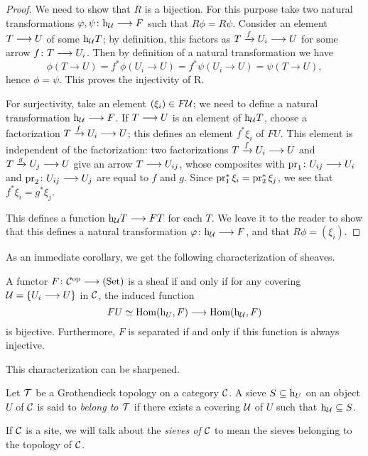 \begin{2   CONTRAVARIANT FUNCTORS}
\begin{2.3 Sheaves in Grothendieck topologies}
\begin{proof}
We need to show that $R$ is a bijection. For this purpose take two natural transformations $\phi, \psi \colon \h_{\cU} \arr F$ such that $R\phi = R\psi$. Consider an element $T \arr U$ of some $\mathrm{h}_{\mathcal{U}}T$; by definition, this factors as $T \xarr{f} U_{i} \arr U$ for some arrow $f \colon T \arr U_{i}$. Then by definition of a natural transformation we have
   \[
   \phi(T \to U) = f^{*}\phi(U_{i}\to U) =
   f^{*}\psi(U_{i}\to U) = \psi(T \to U),
   \]
hence $\phi = \psi$. This proves the injectivity of R.

For surjectivity, take an element $(\xi_{i}) \in F\mathcal{U}$; we need to define a natural transformation $\h_{\cU} \arr F$. If $T \arr U$ is an element of $\mathrm{h}_{\mathcal{U}}T$, choose a factorization $T \xarr{f} U_{i} \arr U$; this defines an element $f^{*}\xi_{i}$ of $FU$. This element is independent of the factorization: two factorizations $T \xrightarrow{f} U_i \arr U$ and $T \xrightarrow{g} U_j \arr U$ give an arrow $T \arr U_{ij}$, whose composites with $\pr_1 \colon U_{ij} \arr U_i$ and $\pr_2 \colon U_{ij} \arr U_j$ are equal to $f$ and $g$. Since $\operatorname{pr}^*_1 \xi_i = \operatorname{pr}^*_2 \xi_j$, we see that $f^{*}\xi_{i} = g^{*}\xi_{j}$.

This defines a function $\h_{\cU}T \arr FT$ for each $T$. We leave it to the reader to show that this defines a natural transformation $\phi \colon \h_{\cU} \arr F$, and that $R\phi = (\xi_{i})$.
\end{proof}

As an immediate corollary, we get the following characterization of sheaves.

\begin{corollary}\label{cor:funnychar-sheaves}
A functor $F \colon \cC\op \arr \catset$ is a sheaf if and only if for any covering $\mathcal{U} = \{U_i \longrightarrow U\}$ in $\mathcal{C}$, the induced function
   \[
   FU \simeq \hom(\h_U, F) \arr  \hom(\h_\cU, F)
   \]
is bijective. Furthermore, $F$ is separated if and only if this function is always injective.
\end{corollary}

This characterization can be sharpened.

\begin{definition}
Let $\mathcal{T}$ be a Grothendieck topology on a category $\mathcal{C}$. A sieve $S \subseteq \mathrm{h}_{U}$ on an object $U$ of $\mathcal{C}$ is said to \emph{belong to $\mathcal{T}$} if there exists a covering $\mathcal{U}$ of $U$ such that $\mathrm{h}_{\mathcal{U}} \subseteq S$.
\end{definition}

If $\mathcal{C}$ is a site, we will talk about the \emph{sieves of $\mathcal{C}$} to mean the sieves belonging to the topology of $\mathcal{C}$.


\end{2.3 Sheaves in Grothendieck topologies}
\end{2   CONTRAVARIANT FUNCTORS}
